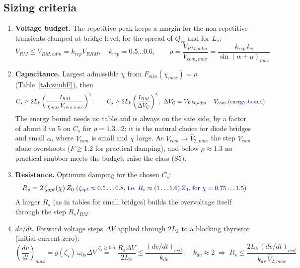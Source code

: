 \documentclass[10pt,a4paper]{scrartcl}
\newcommand{\Lk}{L_{k}}
\newcommand{\VRRM}{V_{RRM}}
\newcommand{\rt}[1]{\text{\small\color{blue!60!black} #1}}
\begin{document}
\subsection{Sizing criteria}
\begin{enumerate}[label=\textbf{C\arabic*},leftmargin=*]
\item \textbf{Voltage budget.} The repetitive peak keeps a margin for the non-repetitive transients clamped at bridge level, for the spread of $Q_{rr}$ and for $L_\sigma$:
\begin{equation}
V_{RM} \le V_{RM,adm} = k_{rep}\VRRM, \quad k_{rep} = 0.5\ldots0.6, \qquad
\rho = \frac{V_{RM,adm}}{V_{com,max}} = \frac{k_{rep}\,k_v}{\sin(\alpha+\mu)_{max}} \label{eq:budget}
\end{equation}
\item \textbf{Capacitance.} Largest admissible $\chi$ from $F_{min}(\chi_{max}) = \rho$ (Table~\ref{tab:snubF}), then
\begin{equation}
C_s \ge 2\Lk\left(\frac{I_{RM}}{\chi_{max}V_{com,max}}\right)^{2}, \qquad
C_s \ge 2\Lk\left(\frac{I_{RM}}{\Delta V_C}\right)^{2},\ \Delta V_C = V_{RM,adm}-V_{com} \;\rt{(energy bound)} \label{eq:Cs}
\end{equation}
The energy bound needs no table and is always on the safe side, by a factor of about 3 to 5 on $C_s$ for $\rho = 1.3\ldots2$; it is the natural choice for diode bridges and small $\alpha$, where $V_{com}$ is small and $\chi$ large. As $V_{com}\to\hat V_{2,max}$ the step $V_{com}$ alone overshoots ($F\ge1.2$ for practical damping), and below $\rho\approx1.3$ no practical snubber meets the budget: raise the class (S5).
\item \textbf{Resistance.} Optimum damping for the chosen $C_s$:
\begin{equation}
R_s = 2\,\zeta_{opt}(\chi)\,Z_0 \;\rt{($\zeta_{opt}\approx0.5\ldots0.8$, i.e.\ $R_s\approx(1\ldots1.6)\,Z_0$, for $\chi = 0.75\ldots1.5$)} \label{eq:Rs}
\end{equation}
A larger $R_s$ (as in tables for small bridges) builds the overvoltage itself through the step $R_sI_{RM}$.
\item \textbf{$dv/dt$.} Forward voltage steps $\Delta V$ applied through $2\Lk$ to a blocking thyristor (initial current zero):
\begin{equation}
\left(\frac{dv}{dt}\right)_{max} = g(\zeta_s)\,\omega_{0s}\Delta V \stackrel{\zeta_s\ge0.5}{=} \frac{R_s\Delta V}{2\Lk} \le \frac{(dv/dt)_{crit}}{k_{dv}}, \quad
k_{dv}\approx2 \;\Rightarrow\; R_s \le \frac{2\Lk\,(dv/dt)_{crit}}{k_{dv}\,\hat V_{2,max}} \label{eq:dvdt}

\end{equation}
\end{enumerate}
\end{document}

